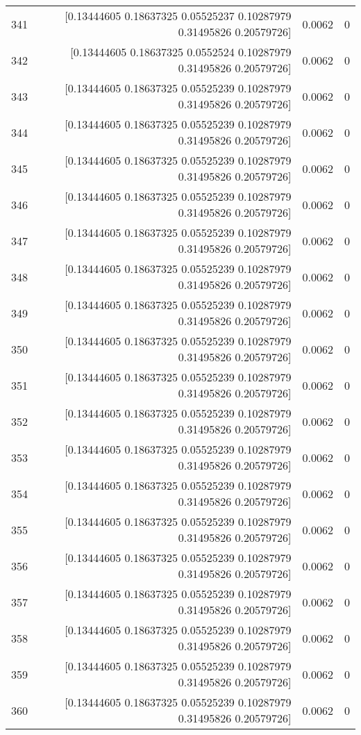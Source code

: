 \begin{longtable}{lrrr}
341 & [0.13444605 0.18637325 0.05525237 0.10287979 0.31495826 0.20579726] & 0.0062 & 0 \\
342 & [0.13444605 0.18637325 0.0552524  0.10287979 0.31495826 0.20579726] & 0.0062 & 0 \\
343 & [0.13444605 0.18637325 0.05525239 0.10287979 0.31495826 0.20579726] & 0.0062 & 0 \\
344 & [0.13444605 0.18637325 0.05525239 0.10287979 0.31495826 0.20579726] & 0.0062 & 0 \\
345 & [0.13444605 0.18637325 0.05525239 0.10287979 0.31495826 0.20579726] & 0.0062 & 0 \\
346 & [0.13444605 0.18637325 0.05525239 0.10287979 0.31495826 0.20579726] & 0.0062 & 0 \\
347 & [0.13444605 0.18637325 0.05525239 0.10287979 0.31495826 0.20579726] & 0.0062 & 0 \\
348 & [0.13444605 0.18637325 0.05525239 0.10287979 0.31495826 0.20579726] & 0.0062 & 0 \\
349 & [0.13444605 0.18637325 0.05525239 0.10287979 0.31495826 0.20579726] & 0.0062 & 0 \\
350 & [0.13444605 0.18637325 0.05525239 0.10287979 0.31495826 0.20579726] & 0.0062 & 0 \\
351 & [0.13444605 0.18637325 0.05525239 0.10287979 0.31495826 0.20579726] & 0.0062 & 0 \\
352 & [0.13444605 0.18637325 0.05525239 0.10287979 0.31495826 0.20579726] & 0.0062 & 0 \\
353 & [0.13444605 0.18637325 0.05525239 0.10287979 0.31495826 0.20579726] & 0.0062 & 0 \\
354 & [0.13444605 0.18637325 0.05525239 0.10287979 0.31495826 0.20579726] & 0.0062 & 0 \\
355 & [0.13444605 0.18637325 0.05525239 0.10287979 0.31495826 0.20579726] & 0.0062 & 0 \\
356 & [0.13444605 0.18637325 0.05525239 0.10287979 0.31495826 0.20579726] & 0.0062 & 0 \\
357 & [0.13444605 0.18637325 0.05525239 0.10287979 0.31495826 0.20579726] & 0.0062 & 0 \\
358 & [0.13444605 0.18637325 0.05525239 0.10287979 0.31495826 0.20579726] & 0.0062 & 0 \\
359 & [0.13444605 0.18637325 0.05525239 0.10287979 0.31495826 0.20579726] & 0.0062 & 0 \\
360 & [0.13444605 0.18637325 0.05525239 0.10287979 0.31495826 0.20579726] & 0.0062 & 0 \\

\end{longtable}
